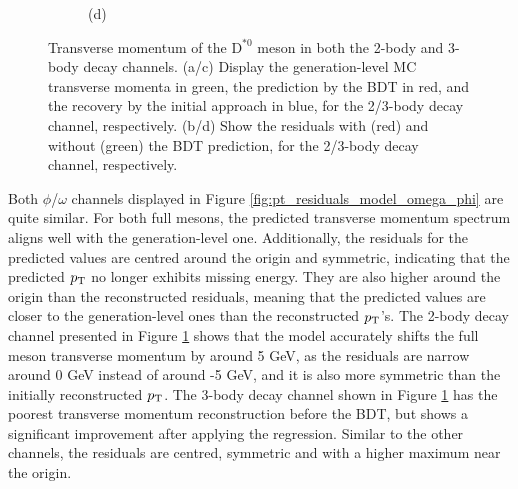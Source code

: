 \begin{figure}[!ht]
\begin{subfigure}[t]{0.50\mylength}
        \vspace*{-0.2cm}
        \caption{\footnotesize (d)}
    \end{subfigure}%
\caption{Transverse momentum of the $\text{D}^{*0}$ meson in both the 2-body and 3-body decay channels. (a/c) Display the generation-level MC transverse momenta in green, the prediction by the BDT in red, and the recovery by the initial approach in blue, for the 2/3-body decay channel, respectively. (b/d) Show the residuals with (red) and without (green) the BDT prediction, for the 2/3-body decay channel, respectively.}
\label{fig:pt_residuals_model_d0star}
    \vspace*{-0.0cm}
\end{figure}

Both $\phi$/$\omega$ channels displayed in Figure \ref{fig:pt_residuals_model_omega_phi} are quite similar. For both full mesons, the predicted transverse momentum spectrum aligns well with the generation-level one. Additionally, the residuals for the predicted values are centred around the origin and symmetric, indicating that the predicted $p_\text{T}$ no longer exhibits missing energy. They are also higher around the origin than the reconstructed residuals, meaning that the predicted values are closer to the generation-level ones than the reconstructed $p_\text{T}$'s. The 2-body decay channel presented in Figure \ref{fig:pt_residuals_model_d0star} shows that the model accurately shifts the full meson transverse momentum by around 5 GeV, as the residuals are narrow around 0 GeV instead of around -5 GeV, and it is also more symmetric than the initially reconstructed $p_\text{T}$. The 3-body decay channel shown in Figure \ref{fig:pt_residuals_model_d0star} has the poorest transverse momentum reconstruction before the BDT, but shows a significant improvement after applying the regression. Similar to the other channels, the residuals are centred, symmetric and with a higher maximum near the origin.

